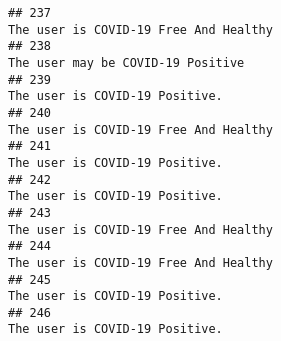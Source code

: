 \documentclass[
]{article}
\begin{document}
\begin{verbatim}
## 237                                                                                                                                                                                                                              The user is COVID-19 Free And Healthy
## 238                                                                                                                                                                                                                                  The user may be COVID-19 Positive
## 239                                                                                                                                                                                                                                     The user is COVID-19 Positive.
## 240                                                                                                                                                                                                                              The user is COVID-19 Free And Healthy
## 241                                                                                                                                                                                                                                     The user is COVID-19 Positive.
## 242                                                                                                                                                                                                                                     The user is COVID-19 Positive.
## 243                                                                                                                                                                                                                              The user is COVID-19 Free And Healthy
## 244                                                                                                                                                                                                                              The user is COVID-19 Free And Healthy
## 245                                                                                                                                                                                                                                     The user is COVID-19 Positive.
## 246                                                                                                                                                                                                                                     The user is COVID-19 Positive.

\end{verbatim}
\end{document}
